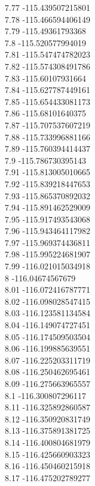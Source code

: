 {7.77	-115.439507215801\\
7.78	-115.466594406149\\
7.79	-115.49361793368\\
7.8	-115.520577994019\\
7.81	-115.547474782023\\
7.82	-115.574308491786\\
7.83	-115.60107931664\\
7.84	-115.627787449161\\
7.85	-115.654433081173\\
7.86	-115.68101640375\\
7.87	-115.707537607219\\
7.88	-115.733996881166\\
7.89	-115.760394414437\\
7.9	-115.786730395143\\
7.91	-115.813005010665\\
7.92	-115.839218447653\\
7.93	-115.865370892032\\
7.94	-115.891462529009\\
7.95	-115.917493543068\\
7.96	-115.943464117982\\
7.97	-115.969374436811\\
7.98	-115.995224681907\\
7.99	-116.021015034918\\
8	-116.04674567679\\
8.01	-116.072416787771\\
8.02	-116.098028547415\\
8.03	-116.123581134584\\
8.04	-116.149074727451\\
8.05	-116.174509503504\\
8.06	-116.199885639551\\
8.07	-116.225203311719\\
8.08	-116.250462695461\\
8.09	-116.275663965557\\
8.1	-116.300807296117\\
8.11	-116.325892860587\\
8.12	-116.350920831749\\
8.13	-116.375891381725\\
8.14	-116.400804681979\\
8.15	-116.425660903323\\
8.16	-116.450460215918\\
8.17	-116.475202789277\\
}
